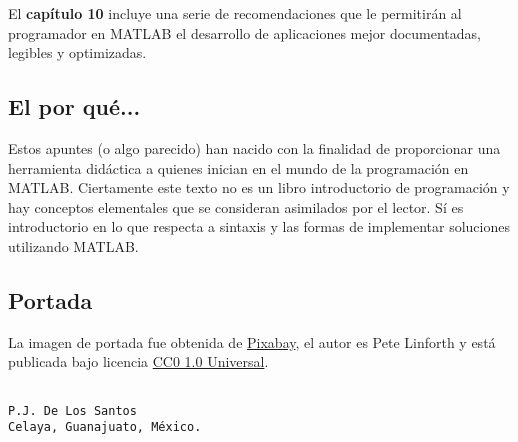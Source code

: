 El \textbf{capítulo 10} incluye una serie de recomendaciones que le
permitirán al programador en MATLAB el desarrollo de aplicaciones mejor
documentadas, legibles y optimizadas. \\

\subsection*{El por qué...}

Estos apuntes (o algo parecido) han nacido con la finalidad de
proporcionar una herramienta didáctica a quienes inician en el mundo de
la programación en MATLAB. Ciertamente este texto no es un libro
introductorio de programación y hay conceptos elementales que se
consideran asimilados por el lector. Sí es introductorio en lo que
respecta a sintaxis y las formas de implementar soluciones utilizando
MATLAB. 


\subsection*{Portada}

La imagen de portada fue obtenida de
\href{https://pixabay.com/es/nano-tecnolog\%C3\%ADa-construcci\%C3\%B3n-1480553/}{Pixabay},
el autor es Pete Linforth y está publicada bajo licencia
\href{https://creativecommons.org/publicdomain/zero/1.0/deed.es}{CC0 1.0
Universal}.


\begin{verbatim}

P.J. De Los Santos
Celaya, Guanajuato, México.
\end{verbatim}

